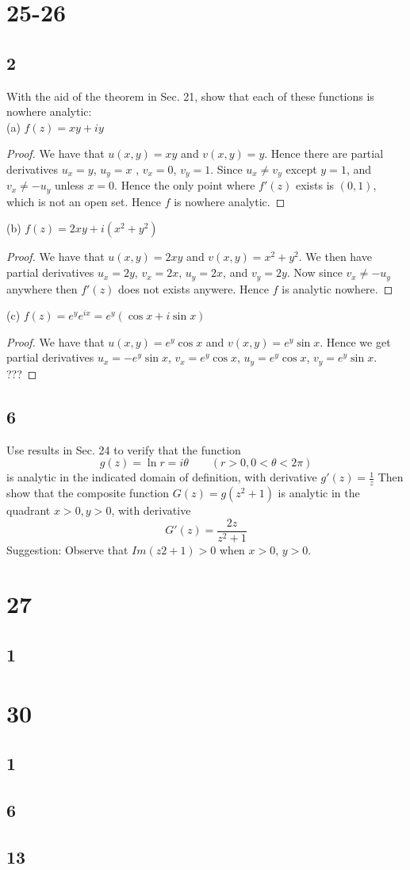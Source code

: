 \documentclass{article}
\begin{document}
    \section*{25-26}
    \subsection*{2}
    With the aid of the theorem in Sec. 21, show that each of these functions is nowhere analytic:\\
    (a) $f(z)=xy+iy$
    \begin{proof}
        We have that $u(x,y)=xy$ and $v(x,y)=y$. Hence there are partial derivatives $u_x=y$, $u_y=x$
        , $v_x=0$, $v_y=1$. Since $u_x \neq v_y$ except $y=1$, and $v_x \neq -u_y$ unless $x=0$. Hence the
        only point where $f'(z)$ exists is $(0, 1)$, which is not an open set. Hence $f$ is nowhere analytic.
    \end{proof}
    (b) $f(z)=2xy+ i(x^2+y^2)$
    \begin{proof}
        We have that $u(x,y)=2xy$ and $v(x,y)=x^2+y^2$. We then have partial derivatives $u_x = 2y$,
        $v_x=2x$, $u_y=2x$, and $v_y=2y$. Now since $v_x \neq -u_y$ anywhere then $f'(z)$ does not exists
        anywere. Hence $f$ is analytic nowhere.
    \end{proof}
    (c) $f(z)=e^y e^{ix}=e^y(\cos x + i\sin x)$
    \begin{proof}
        We have that $u(x,y)=e^y\cos x$ and $v(x,y) = e^y\sin x$. Hence we get partial derivatives
        $u_x=-e^y\sin x$, $v_x=e^y\cos x$, $u_y=e^y \cos x$, $v_y=e^y\sin x$. ???
    \end{proof}
    \subsection*{6}
    Use results in Sec. 24 to verify that the function $$g(z) = \ln r = i\theta \qquad (r > 0, 0 < \theta < 2\pi)$$
    is analytic in the indicated domain of definition, with derivative $g'(z) = \frac{1}{z}$
    Then show that the composite function $G(z) = g(z^2 + 1)$ is analytic in the quadrant $x > 0, y > 0$, with derivative
    $$G'(z)=\frac{2z}{z^2 + 1}$$ Suggestion: Observe that $Im(z2 + 1) > 0$ when $x > 0$, $y > 0$.
    \section*{27}
    \subsection*{1}
    \section*{30}
    \subsection*{1}
    \subsection*{6}
    \subsection*{13}
\end{document}
